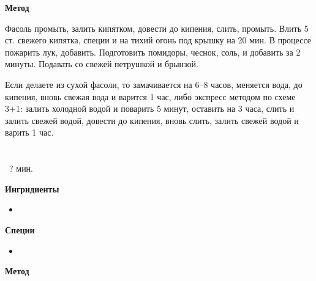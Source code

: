 \textbf{\large Метод}

Фасоль промыть, залить кипятком, довести до кипения, слить, промыть. Влить 5 ст. свежего кипятка, специи и на тихий огонь под крышку на 20 мин. В процессе пожарить лук, добавить. Подготовить помидоры, чеснок, соль, и добавить за 2 минуты. Подавать со свежей петрушкой и брынзой.

Если делаете из сухой фасоли, то замачивается на 6–8 часов, меняется вода, до кипения, вновь свежая вода и варится 1 час, либо экспресс методом по схеме 3+1: залить холодной водой и поварить 5 минут, оставить на 3 часа, слить и залить свежей водой, довести до кипения, вновь слить, залить свежей водой и варить 1 час.

 



\newpage
\section*{\Large }
\label{sec:soup2}

\faClockO\ ? мин.

\textbf{\large Ингридиенты}
\begin{itemize}
\item 
\end{itemize}

\textbf{Специи}
\begin{itemize}
\item 
\end{itemize}


\textbf{\large Метод}

